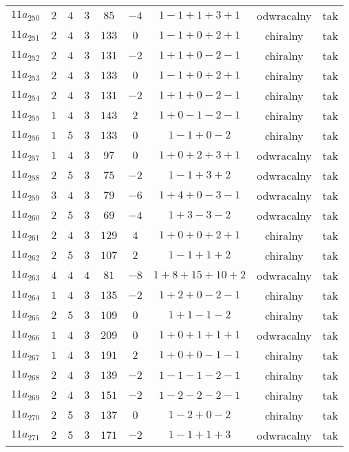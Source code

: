 \begin{longtable}{ccccccccc}
$11a_{250}$ & $2$ & $4$ & $3$ & $85$ & $-4$ & $1-1+1+3+1$ & odwracalny & tak \\
$11a_{251}$ & $2$ & $4$ & $3$ & $133$ & $0$ & $1-1+0+2+1$ & chiralny & tak \\
$11a_{252}$ & $2$ & $4$ & $3$ & $131$ & $-2$ & $1+1+0-2-1$ & chiralny & tak \\
$11a_{253}$ & $2$ & $4$ & $3$ & $133$ & $0$ & $1-1+0+2+1$ & chiralny & tak \\
$11a_{254}$ & $2$ & $4$ & $3$ & $131$ & $-2$ & $1+1+0-2-1$ & chiralny & tak \\
$11a_{255}$ & $1$ & $4$ & $3$ & $143$ & $2$ & $1+0-1-2-1$ & chiralny & tak \\
$11a_{256}$ & $1$ & $5$ & $3$ & $133$ & $0$ & $1-1+0-2$ & chiralny & tak \\
$11a_{257}$ & $1$ & $4$ & $3$ & $97$ & $0$ & $1+0+2+3+1$ & odwracalny & tak \\
$11a_{258}$ & $2$ & $5$ & $3$ & $75$ & $-2$ & $1-1+3+2$ & odwracalny & tak \\
$11a_{259}$ & $3$ & $4$ & $3$ & $79$ & $-6$ & $1+4+0-3-1$ & odwracalny & tak \\
$11a_{260}$ & $2$ & $5$ & $3$ & $69$ & $-4$ & $1+3-3-2$ & odwracalny & tak \\
$11a_{261}$ & $2$ & $4$ & $3$ & $129$ & $4$ & $1+0+0+2+1$ & chiralny & tak \\
$11a_{262}$ & $2$ & $5$ & $3$ & $107$ & $2$ & $1-1+1+2$ & chiralny & tak \\
$11a_{263}$ & $4$ & $4$ & $4$ & $81$ & $-8$ & $1+8+15+10+2$ & odwracalny & tak \\
$11a_{264}$ & $1$ & $4$ & $3$ & $135$ & $-2$ & $1+2+0-2-1$ & chiralny & tak \\
$11a_{265}$ & $2$ & $5$ & $3$ & $109$ & $0$ & $1+1-1-2$ & chiralny & tak \\
$11a_{266}$ & $1$ & $4$ & $3$ & $209$ & $0$ & $1+0+1+1+1$ & odwracalny & tak \\
$11a_{267}$ & $1$ & $4$ & $3$ & $191$ & $2$ & $1+0+0-1-1$ & chiralny & tak \\
$11a_{268}$ & $2$ & $4$ & $3$ & $139$ & $-2$ & $1-1-1-2-1$ & chiralny & tak \\
$11a_{269}$ & $2$ & $4$ & $3$ & $151$ & $-2$ & $1-2-2-2-1$ & chiralny & tak \\
$11a_{270}$ & $2$ & $5$ & $3$ & $137$ & $0$ & $1-2+0-2$ & chiralny & tak \\
$11a_{271}$ & $2$ & $5$ & $3$ & $171$ & $-2$ & $1-1+1+3$ & odwracalny & tak \\

\end{longtable}
